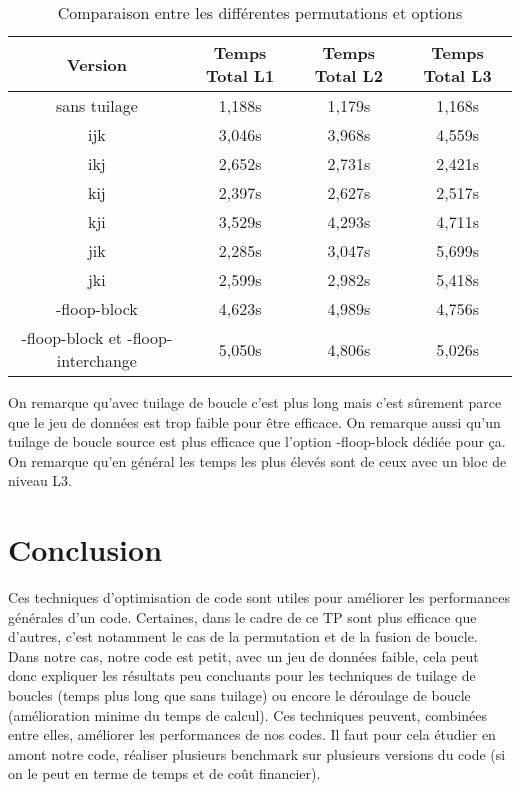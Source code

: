 \documentclass{rapport}
\begin{document}
\begin{table}[H]
    \centering
    \begin{tabular}{|c|c|c|c|}
        \hline
        Version & Temps Total L1 & Temps Total L2 & Temps Total L3 \\
        \hline
        sans tuilage & 1,188s & 1,179s & 1,168s\\
        \hline
        ijk & 3,046s & 3,968s & 4,559s \\
        \hline
        ikj & 2,652s & 2,731s &2,421s \\
        \hline
        kij & 2,397s & 2,627s & 2,517s\\
        \hline
        kji & 3,529s & 4,293s & 4,711s\\
        \hline
        jik & 2,285s & 3,047s & 5,699s\\
        \hline
        jki & 2,599s & 2,982s & 5,418s\\
        \hline
        -floop-block & 4,623s & 4,989s & 4,756s\\
        \hline
        -floop-block et -floop-interchange & 5,050s & 4,806s & 5,026s\\
        \hline
    \end{tabular}
    \caption{Comparaison entre les différentes permutations et options}
\end{table}
On remarque qu'avec tuilage de boucle c'est plus long mais c'est sûrement parce que le jeu de données est trop faible pour être efficace. On remarque aussi qu'un tuilage de boucle source est plus efficace que l'option -floop-block dédiée pour ça. On remarque qu'en général les temps les plus élevés sont de ceux avec un bloc de niveau L3.

\clearpage
\part{Conclusion}
Ces techniques d'optimisation de code sont utiles pour améliorer les performances générales d'un code. Certaines, dans le cadre de ce TP sont plus efficace que d'autres, c'est notamment le cas de la permutation et de la fusion de boucle. Dans notre cas, notre code est petit, avec un jeu de données faible, cela peut donc expliquer les résultats peu concluants pour les techniques de tuilage de boucles (temps plus long que sans tuilage) ou encore le déroulage de boucle (amélioration minime du temps de calcul).
\newline
Ces techniques peuvent, combinées entre elles, améliorer les performances de nos codes. Il faut pour cela étudier en amont notre code, réaliser plusieurs benchmark sur plusieurs versions du code (si on le peut en terme de temps et de coût financier).
\end{document}
